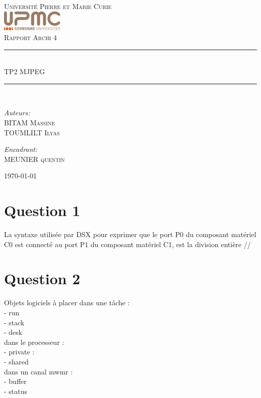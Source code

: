 \documentclass[12pt]{article}
\newcommand{\HRule}{\rule{\linewidth}{0.5mm}}
\begin{document}
\begin{titlepage}
  \begin{center}
    \textsc{\LARGE Université Pierre et Marie Curie}\\[1.5cm]
    \includegraphics[height=1cm]{upmc.png}\\[1.5cm]
    \textsc{\Large Rapport Archi 4 }\\[2cm]
    \HRule \\[1cm]
    \textsc{\huge TP2 MJPEG }\\[0.5cm]
    \HRule \\[1cm]
    \noindent
    \begin{minipage}[t]{0.55\textwidth}
      \begin{flushleft} \large
        \emph{Auteurs:}\\
        BITAM \textsc{Massine}\\
        TOUMLILT \textsc{Ilyas}
      \end{flushleft}
    \end{minipage}%
    \begin{minipage}[t]{0.47\textwidth}
      \begin{flushright} \large
        \emph{Encadrant:} \\
        MEUNIER \textsc{quentin}
      \end{flushright}
    \end{minipage}
    \vfill
    {\large \today}
  \end{center}
\end{titlepage}

\section*{Question 1}
La syntaxe utilisée par DSX pour exprimer que le port P0 du composant matériel C0 est connecté au 
port P1 du composant matériel C1, est la division entière //

\section*{Question 2}
Objets logiciels à placer dans une tâche :\\
- run\\
- stack\\
- desk \\
dans le processeur :\\
- private :\\
- shared \\
dans un canal mwmr :\\
- buffer\\
- status\\
\end{document}
